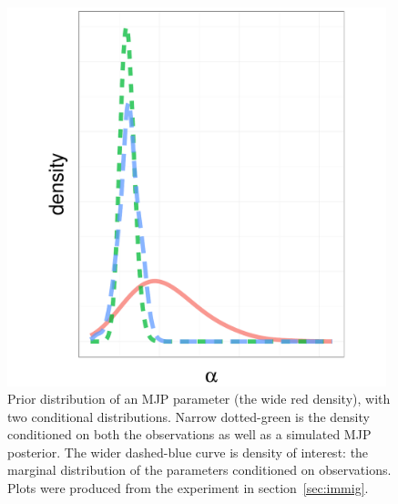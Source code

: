 

  \begin{figure}%
  \centering
  \begin{minipage}[hp]{0.35\linewidth}
  \centering
    \vspace{-0 in}
    \includegraphics [width=0.98\textwidth, angle=0]{figs/dist_beta_PC.pdf}

  \end{minipage}
  \begin{minipage}[hp]{0.64\linewidth}
  \caption{Prior distribution of an MJP parameter (the wide red density), with two conditional distributions. 
    Narrow dotted-green is the density conditioned on both the observations as well as a simulated MJP posterior. 
    The wider dashed-blue curve is density of interest: the marginal distribution of the parameters conditioned on observations. 
  Plots were produced from the experiment in section~\ref{sec:immig}.}
     \label{fig:hist}
  \end{minipage}
  \end{figure}


